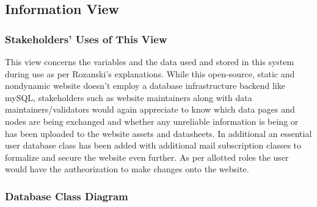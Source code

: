 \vspace*{\fill}
\newpage

\subsection{Information View}

\subsubsection{Stakeholders' Uses of This View}

This view concerns the variables and the data used and stored in this system during use as per Rozanski’s explanations. While this open-source, static and nondynamic website doesn’t employ a database infrastructure backend like mySQL, stakeholders such as website maintainers along with data maintainers/validators would again appreciate to know which data pages and nodes are being exchanged and whether any unreliable information is being or has been uploaded to the website assets and datasheets. In additional an essential user database class has been added with additional mail subscription classes to formalize and secure the website even further. As per allotted roles the user would have the autheorization to make changes onto the website.

\subsubsection{Database Class Diagram}

